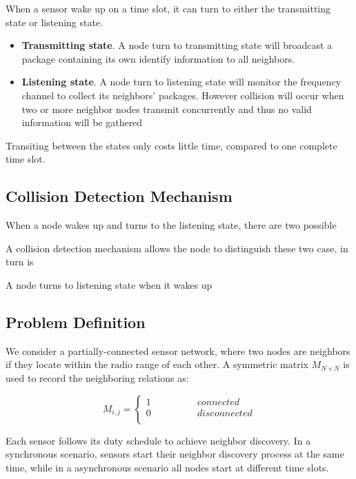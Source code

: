 When a sensor wake up on a time slot, it can turn to either the transmitting state or listening state. 
\begin{itemize}
\item \textbf{Transmitting state}. A node turn to transmitting state will broadcast a package containing its own identify 
information to all neighbors.
\item  \textbf{Listening state}. A node turn to listening state will monitor the frequency channel to collect its neighbors' packages.
However collision will occur when two or more neighbor nodes transmit concurrently and thus no valid information will be gathered
\end{itemize}
Transiting between the states only costs little time, compared to one complete time slot.

\subsection{Collision Detection Mechanism}

When a node wakes up and turns to the listening state, there are two possible 



A collision detection mechanism allows the node to distinguish these two case, in turn is 


A node turns to listening state when it wakes up




\subsection{Problem Definition}

We consider a partially-connected sensor network, 
where two nodes are neighbors if they locate within the radio range of each other. 
A  symmetric matrix $M_{N\times N}$ is used to record the neighboring relations as:

$$ M_{i,j}=\left\{
\begin{aligned}
1  & & & & & & {connected}\\
0  & & & & & & {disconnected}\\
\end{aligned}
\right.
$$

Each sensor follows its duty schedule to achieve neighbor discovery. In a synchronous scenario,
sensors start their neighbor discovery process at the same time, while in a asynchronous  scenario
all nodes start at different time slots.
 
